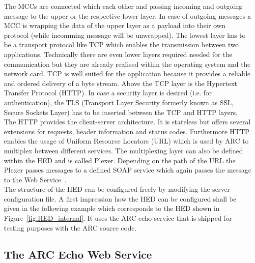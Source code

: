The MCCs are connected which each other and passing incoming and outgoing message to the upper or the respective lower layer. In case of outgoing messages a MCC is wrapping the data of the upper layer as a payload into their own protocol (while incomming message will be unwrapped).
The lowest layer has to be a transport protocol like TCP which enables the transmission between two applications.
Technically there are even lower layers required needed for the communication but they are already realised within the operating system and the  network card.
TCP is well suited for the application because it provides a reliable and ordered delivery of a byte stream.
Above the TCP layer is the Hypertext Transfer Protocol (HTTP). 
In case a security layer is desired (i.e. for authentication), the TLS (Transport Layer Security formerly known as SSL, Secure Sockets Layer) has to be inserted between the TCP and HTTP layers.
The HTTP provides the client-server architecture. It is stateless but offers several extensions for requests, header information and status codes. Furthermore HTTP enables the usage of Uniform Resource Locators (URL) which is used by ARC to multiplex between different services. The multiplexing layer can also be defined within the HED and is called Plexer.
Depending on the path of the URL the Plexer passes messages to a defined SOAP service which again passes the message to the Web Service~\cite{QIANG_2005}.\\


The structure of the HED can be configured freely by modifying the server configuration file.
A first impression how the HED can be configured shall be given in the following example which corresponds to the HED shown in Figure~\ref{fig:HED_internal}.
It uses the ARC echo service that is shipped for testing purposes with the ARC source code.



\subsection{The ARC Echo Web Service}


